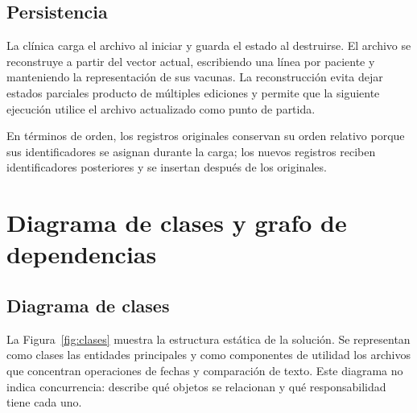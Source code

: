 \documentclass[12pt,letterpaper]{article}
\begin{document}
\subsection{Persistencia}

La clínica carga el archivo al iniciar y guarda el estado al destruirse. El
archivo se reconstruye a partir del vector actual, escribiendo una línea por
paciente y manteniendo la representación de sus vacunas. La reconstrucción
evita dejar estados parciales producto de múltiples ediciones y permite que la
siguiente ejecución utilice el archivo actualizado como punto de partida.

En términos de orden, los registros originales conservan su orden relativo
porque sus identificadores se asignan durante la carga; los nuevos registros
reciben identificadores posteriores y se insertan después de los originales.

\section{Diagrama de clases y grafo de dependencias}

\subsection{Diagrama de clases}

La Figura~\ref{fig:clases} muestra la estructura estática de la solución. Se
representan como clases las entidades principales y como componentes de utilidad
los archivos que concentran operaciones de fechas y comparación de texto. Este
diagrama no indica concurrencia: describe qué objetos se relacionan y qué
responsabilidad tiene cada uno.
\end{document}
